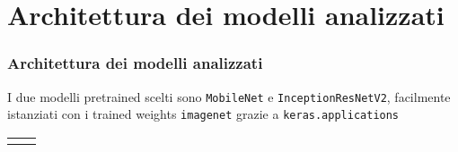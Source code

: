 \documentclass{beamer}
\newcommand{\dflvspace}{\vspace{10pt}}
\renewcommand{\footnotesize}{\tiny}
\newcommand{\dnnarch}[1]{
    \tikzset{
    	node/.style={draw, minimum width=4.2cm},
    	data/.style={align=center, minimum width=4.2cm}
	}

	\begin{tikzpicture}[node distance=0.35cm, auto, >=latex]
  		\node[data](data) {\footnotesize immagine 319x319 RGB};
    	\foreach \nd/\td/\cd [remember=\nd as \Nd (initially data)] in #1 {
        	\node [node, align=center, fill=\cd, below=of \Nd] (\nd) {\td};
        	\draw[->](\Nd)--(\nd);
    	}
    	\node[data, below=of out] (Data) {\footnotesize vettore di 10 probabilità};
    	\draw[->](out)--(Data);
    	
	\end{tikzpicture}
}
\begin{document}
\section{Architettura dei modelli analizzati}
\begin{frame}
    \frametitle{Architettura dei modelli analizzati}
    
    I due modelli pretrained scelti sono \texttt{MobileNet} e \texttt{InceptionResNetV2},
    facilmente istanziati con i trained weights \texttt{imagenet} grazie a \texttt{keras.applications}
    
    \dflvspace
    \dflvspace
    
    \begin{tabular}{c c}
    
    \def\firstlayers{
    	a/\tiny{Rescaling in $$[\,-1\,\dots\,1\,]$$ - 0 - $319\times 319\times 3$ }/white,
    	b/\tiny{MobileNet - $3.3M$ - $10\times 10\times 1024$}/cyan,
    	c/\tiny{GlobalAvgPool - $0$ - $1024$}/white,
    	d/\tiny{Dropout di $0.25$ - $0$ - $1024$}/white,
    	out/\tiny{Dense (softmax) - $10k$ - $10$} /white}
    
	\dnnarch{\firstlayers}
	
	&
	
	\def\secondlayers{
    	a/\tiny{Rescaling in $$[\,-1\,\dots\,1\,]$$ - 0 - $319\times 319\times 3$ }/white,
    	b/\tiny{InceptionResNetV2 - $54.3M$ - $8\times 8\times 1536$}/cyan,
    	c/\tiny{GlobalAvgPool - $0$ - $1536$}/white,
    	d/\tiny{Dropout di $0.4$ - $0$ - $1536$}/white,
    	out/\tiny{Dense (softmax) - $15k$ - $10$} /white}
    
	\dnnarch{\secondlayers}
	
	\end{tabular}
    
\end{frame}
\end{document}
